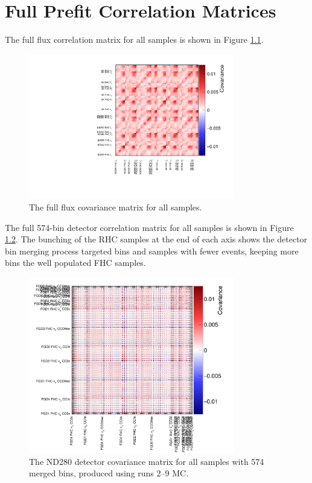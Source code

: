 \chapter{Full Prefit Correlation Matrices}\label{app:matrices}

The full flux correlation matrix for all samples is shown in Figure \ref{fig:fluxcov}.

\begin{figure}[!htbp]
\centering
\includegraphics*[width=0.8\textwidth,clip]{figs/fluxcov}
\caption{The full flux covariance matrix for all samples.}\label{fig:fluxcov}
\end{figure}

The full 574-bin detector correlation matrix for all samples is shown in Figure \ref{fig:detcorr574All}. The bunching of the RHC samples at the end of each axis shows the detector bin merging process targeted bins and samples with fewer events, keeping more bins the well populated FHC samples.

\begin{figure}[!htbp]
\centering
\includegraphics*[width=0.8\textwidth,clip]{figs/detcov574}
\caption{The ND280 detector covariance matrix for all samples with 574 merged bins, produced using runs 2--9 MC.}\label{fig:detcorr574All}
\end{figure}

